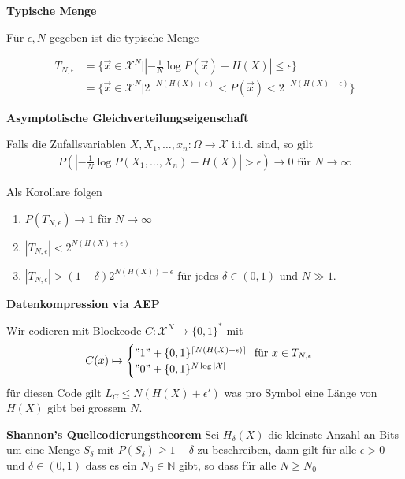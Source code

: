 \documentclass[25pt]{sciposter}
\newcommand{\N}{\mathbb{N}}
\newenvironment{defn}[1]{\begin{mdframed}[backgroundcolor=blue!10,innertopmargin=15pt, nobreak=true,innerbottommargin=15pt]
		\textbf{#1 }
	}
	{ 
	\end{mdframed}
}
\newenvironment{thm}[1]{\begin{mdframed}[nobreak=true,backgroundcolor=Emerald!10,innertopmargin=15pt, innerbottommargin=15pt]
		\textbf{#1 }
	}
	{ 
	\end{mdframed}
}
\begin{document}
\begin{multicols}{3}
\begin{defn}{Typische Menge}
	
	Für $\epsilon, N$ gegeben ist die typische Menge
	
	\begin{align*}
		T_{N,\epsilon} &= \bigg\{ \vec{x} \in \mathcal{X}^N |  \left| -\frac{1}{N}\log P(\vec{x}) - H(X) \right|  \leq \epsilon \bigg \}\\
		&= \bigg\{ \vec{x} \in \mathcal{X}^N | 2^{-N(H(X)+\epsilon)} < P(\vec{x}) < 2^{-N(H(X)-\epsilon)} \bigg \}
	\end{align*}
\end{defn}


\begin{thm}{Asymptotische Gleichverteilungseigenschaft}
	Falls die Zufallsvariablen $X,X_1,\ldots,x_n:\Omega\to \mathcal{X}$ i.i.d. sind, so gilt
	\begin{align*}
P\left( \left| -\frac{1}{N}\log P(X_1,\ldots,X_n) - H(X) \right|  > \epsilon \right) \to 0  \text{ für } N \to \infty
	\end{align*}
	
	Als Korollare folgen
	\begin{enumerate}
		\item $P(T_{N,\epsilon}) \to 1$ für $N \to \infty$
		\item $|T_{N,\epsilon}| < 2^{N(H(X) + \epsilon)}$
		\item $|T_{N,\epsilon}| > (1-\delta)2^{N(H(X)) - \epsilon}$ für jedes $\delta \in (0,1)$ und $N \gg 1$.
	\end{enumerate}
\end{thm}


\begin{defn}{Datenkompression via AEP}
Wir codieren mit Blockcode $C:\mathcal{X}^N \to \{0,1\}^*$ mit 
\begin{align*}
	C(x) \mapsto \begin{cases}
	"1" + \{0,1\}^{\lceil N(H(X) + \epsilon) \rceil} \ \text{ für } x \in T_{N,\epsilon}\\
	"0" + \{0,1\}^{N\log |\mathcal{X}|}
	\end{cases}
\end{align*}
für diesen Code gilt $L_C \leq N(H(X) + \epsilon')$ was pro Symbol eine Länge von $H(X)$ gibt bei grossem $N$.
\end{defn}



\begin{thm}{Shannon's Quellcodierungstheorem} Sei $H_\delta(X)$ die kleinste Anzahl an Bits um eine Menge $S_\delta$ mit $P(S_\delta)\geq 1-\delta$ zu beschreiben, dann gilt für alle $\epsilon > 0$ und $\delta\in (0,1)$ dass es ein $N_0 \in \N$ gibt, so dass für alle $N \geq N_0$
	

\end{thm}
\end{multicols}
\end{document}
